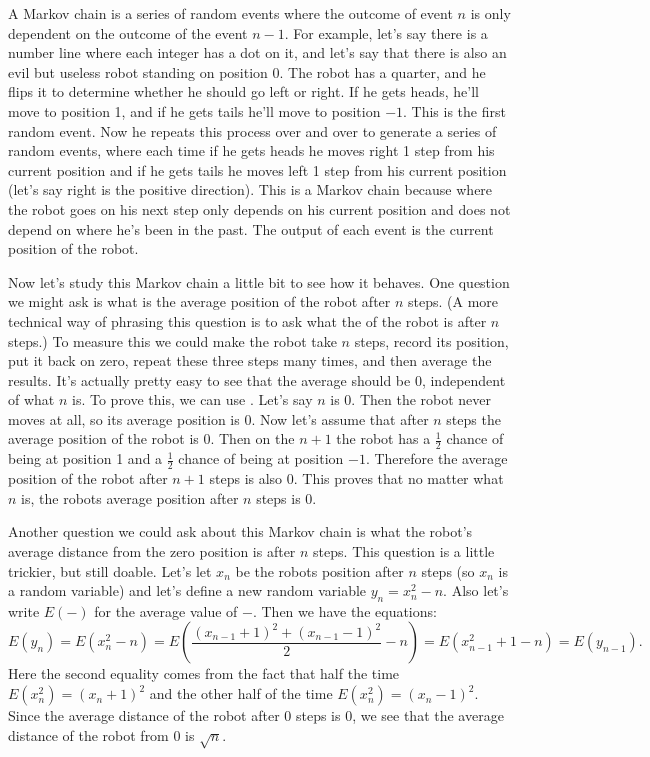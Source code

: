 

A Markov chain is a series of random events where the outcome of event $n$ is only dependent on the outcome of the event $n - 1$. For example, let's say there is a number line where each integer has a dot on it, and let's say that there is also an evil but useless robot standing on position 0. The robot has a quarter, and he flips it to determine whether he should go left or right. If he gets heads, he'll move to position 1, and if he gets tails he'll move to position $-1$. This is the first random event. Now he repeats this process over and over to generate a series of random events, where each time if he gets heads he moves right 1 step from his current position and if he gets tails he moves left 1 step from his current position (let's say right is the positive direction). This is a Markov chain because where the robot goes on his next step only depends on his current position and does not depend on where he's been in the past. The output of each event is the current position of the robot.


Now let's study this Markov chain a little bit to see how it behaves. One question we might ask is what is the average position of the robot after $n$ steps. (A more technical way of phrasing this question is to ask what the  of the robot is after $n$ steps.) To measure this we could make the robot take $n$ steps, record its position, put it back on zero, repeat these three steps many times, and then average the results. It's actually pretty easy to see that the average should be 0, independent of what $n$ is. To prove this, we can use . Let's say $n$ is 0. Then the robot never moves at all, so its average position is 0. Now let's assume that after $n$ steps the average position of the robot is 0. Then on the $n+1$ the robot has a $\frac{1}{2}$ chance of being at position 1 and a $\frac{1}{2}$ chance of being at position $-1$. Therefore the average position of the robot after $n+1$ steps is also 0. This proves that no matter what $n$ is, the robots average position after $n$ steps is 0.


Another question we could ask about this Markov chain is what the robot's average distance from the zero position is after $n$ steps. This question is a little trickier, but still doable. Let's let  $x_n$ be the robots position after $n$ steps (so $x_n$ is a random variable) and let's define a new random variable $y_n= x_n^2 - n$. Also let's write $E(-)$ for the average value of $-$. Then we have the equations: 
	\[
	E(y_n)= E(x_n^2-n)= E\left( \frac{(x_{n-1} + 1)^2 + (x_{n-1} -1)^2}{2} - n \right)= E(x_{n-1}^2 + 1 -n)= E(y_{n-1}).
	\]
Here the second equality comes from the fact that half the time $E(x_n^2)= (x_n+1)^2$ and the other half of the time $E(x_n^2)= (x_n-1)^2$. Since the average distance of the robot after 0 steps is 0, we see that the average distance of the robot from 0 is $\sqrt{n}$.